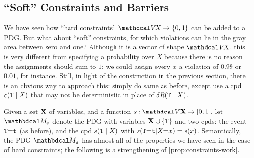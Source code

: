 

\subsection{``Soft'' Constraints and Barriers}
    \label{sec:soft-constraint-widget}

We have seen how ``hard constraints''  $\V\!X \to \{0, 1\}$ can be added to a PDG.
But what about ``soft'' constraints, 
    for which violations can lie in the gray area between zero and one? 
%
Although it is a vector of shape $\V \!X$, 
this is very different from specifying a probability over $X$
because there is no reason the assignments should sum to $1$;
we could assign every $x$ a violation of $0.99$ or $0.01$, for instance.
Still, 
in light of the construction in the previous section, there is an obvious way to approach this: simply do same as before, except use a cpd $c({\tt T} \mid X)$ that may not be deterministic in place of $\delta R({\tt T}\mid X)$. 


Given a set $\mathbf X$ of variables, and a function
$s : \V\mat X \to [0,1]$, let $\dg M_s$ denote the PDG with variables 
    $\mathbf X \cup \{ {\tt T}\}$ 
    and two cpds:
    the event ${\tt T}{=}{\tt t}$ (as before),
    and the cpd 
    $s({\tt T} \mid X)$ with $s({\tt T}{=}{\tt t}|X{=}x) = s(x)$.
Semantically, the PDG $\dg M_s$ has almost all of the properties we have seen in the case of hard constraints; the following is a strengthening of \cref{prop:constraints-work}. 

